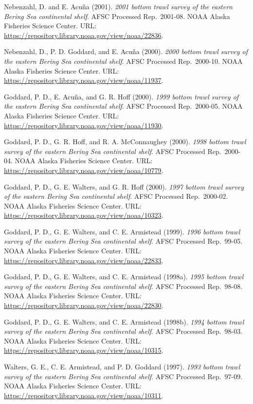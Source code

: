 \documentclass[
  letterpaper,
  oneside,
  open=any]{scrbook}
\begin{document}
Nebenzahl, D. and E. Acuña (2001). \emph{2001 bottom trawl survey of the
eastern Bering Sea continental shelf}. AFSC Processed Rep.~2001-08. NOAA
Alaska Fisheries Science Center. URL:
\url{https://repository.library.noaa.gov/view/noaa/22836}.

Nebenzahl, D., P. D. Goddard, and E. Acuña (2000). \emph{2000 bottom
trawl survey of the eastern Bering Sea continental shelf}. AFSC
Processed Rep.~2000-10. NOAA Alaska Fisheries Science Center. URL:
\url{https://repository.library.noaa.gov/view/noaa/11937}.

Goddard, P. D., E. Acuña, and G. R. Hoff (2000). \emph{1999 bottom trawl
survey of the eastern Bering Sea continental shelf}. AFSC Processed
Rep.~2000-05. NOAA Alaska Fisheries Science Center. URL:
\url{https://repository.library.noaa.gov/view/noaa/11930}.

Goddard, P. D., G. R. Hoff, and R. A. McConnaughey (2000). \emph{1998
bottom trawl survey of the eastern Bering Sea continental shelf}. AFSC
Processed Rep.~2000-04. NOAA Alaska Fisheries Science Center. URL:
\url{https://repository.library.noaa.gov/view/noaa/10779}.

Goddard, P. D., G. E. Walters, and G. R. Hoff (2000). \emph{1997 bottom
trawl survey of the eastern Bering Sea continental shelf}. AFSC
Processed Rep.~2000-02. NOAA Alaska Fisheries Science Center. URL:
\url{https://repository.library.noaa.gov/view/noaa/10323}.

Goddard, P. D., G. E. Walters, and C. E. Armistead (1999). \emph{1996
bottom trawl survey of the eastern Bering Sea continental shelf}. AFSC
Processed Rep.~99-05. NOAA Alaska Fisheries Science Center. URL:
\url{https://repository.library.noaa.gov/view/noaa/22833}.

Goddard, P. D., G. E. Walters, and C. E. Armistead (1998a). \emph{1995
bottom trawl survey of the eastern Bering Sea continental shelf}. AFSC
Processed Rep.~98-08. NOAA Alaska Fisheries Science Center. URL:
\url{https://repository.library.noaa.gov/view/noaa/22830}.

Goddard, P. D., G. E. Walters, and C. E. Armistead (1998b). \emph{1994
bottom trawl survey of the eastern Bering Sea continental shelf}. AFSC
Processed Rep.~98-03. NOAA Alaska Fisheries Science Center. URL:
\url{https://repository.library.noaa.gov/view/noaa/10315}.

Walters, G. E., C. E. Armistead, and P. D. Goddard (1997). \emph{1993
bottom trawl survey of the eastern Bering Sea continental shelf}. AFSC
Processed Rep.~97-09. NOAA Alaska Fisheries Science Center. URL:
\url{https://repository.library.noaa.gov/view/noaa/10311}.
\end{document}

